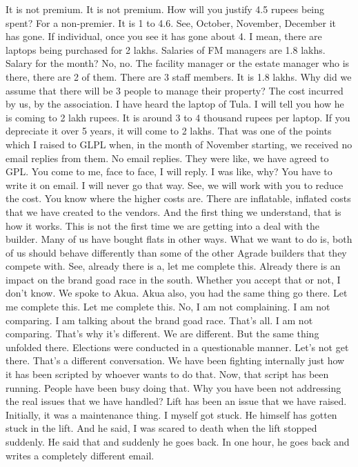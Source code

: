 It is not premium.
It is not premium.
How will you justify 4.5 rupees being spent?
For a non-premier.
It is 1 to 4.6.
See, October, November, December it has gone.
If individual, once you see it has gone about 4.
I mean, there are laptops being purchased for 2 lakhs.
Salaries of FM managers are 1.8 lakhs.
Salary for the month?
No, no.
The facility manager or the estate manager who is there,
there are 2 of them.
There are 3 staff members.
It is 1.8 lakhs.
Why did we assume that there will be 3 people to manage their property?
The cost incurred by us, by the association.
I have heard the laptop of Tula.
I will tell you how he is coming to 2 lakh rupees.
It is around 3 to 4 thousand rupees per laptop.
If you depreciate it over 5 years, it will come to 2 lakhs.
That was one of the points which I raised to GLPL when,
in the month of November starting, we received no email replies from them.
No email replies.
They were like, we have agreed to GPL.
You come to me, face to face, I will reply.
I was like, why?
You have to write it on email.
I will never go that way.
See, we will work with you to reduce the cost.
You know where the higher costs are.
There are inflatable, inflated costs that we have created to the vendors.
And the first thing we understand, that is how it works.
This is not the first time we are getting into a deal with the builder.
Many of us have bought flats in other ways.
What we want to do is, both of us should behave differently
than some of the other Agrade builders that they compete with.
See, already there is a, let me complete this.
Already there is an impact on the brand goad race in the south.
Whether you accept that or not, I don't know.
We spoke to Akua.
Akua also, you had the same thing go there.
Let me complete this.
Let me complete this.
No, I am not complaining.
I am not comparing.
I am talking about the brand goad race.
That's all.
I am not comparing.
That's why it's different.
We are different.
But the same thing unfolded there.
Elections were conducted in a questionable manner.
Let's not get there.
That's a different conversation.
We have been fighting internally just how it has been scripted
by whoever wants to do that.
Now, that script has been running.
People have been busy doing that.
Why you have been not addressing the real issues that we have handled?
Lift has been an issue that we have raised.
Initially, it was a maintenance thing.
I myself got stuck.
He himself has gotten stuck in the lift.
And he said, I was scared to death when the lift stopped suddenly.
He said that and suddenly he goes back.
In one hour, he goes back and writes a completely different email.
